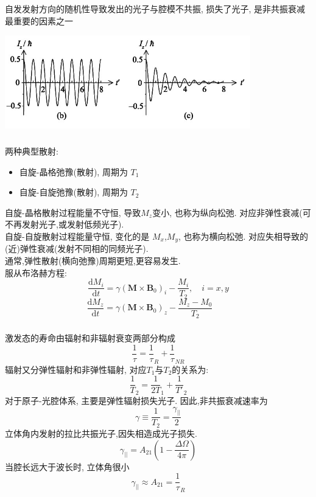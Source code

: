 \begin{frame} 
\frametitle{}
自发发射方向的随机性导致发出的光子与腔模不共振, 损失了光子, 是非共振衰减最重要的因素之一   
  \begin{center}
       \includegraphics[width=0.8\textwidth]{figs/2022-05-25-11-29-29.png}
  \end{center} 
\end{frame}

\begin{frame} 
\frametitle{}
两种典型散射:
\begin{itemize}
    \item 自旋-晶格弛豫(散射), 周期为 $T_1$
    \item 自旋-自旋弛豫(散射), 周期为 $T_2$
\end{itemize}
自旋-晶格散射过程能量不守恒, 导致$M_z$变小, 也称为纵向松弛. 对应非弹性衰减(可不再发射光子,或发射低频光子). \\ 自旋-自旋散射过程能量守恒, 变化的是 $M_x$,$M_y$, 也称为横向松弛. 对应失相导致的(近)弹性衰减(发射不同相的同频光子).  \\ 
通常,弹性散射(横向弛豫)周期更短,更容易发生.\\ {\vspace*{1.3em}} 
服从布洛赫方程: 
\[ \frac{\mathrm{d} M_i}{\mathrm{d}t} = \gamma (\mathbf{M}\times \mathbf{B}_0)_i - \frac{M_i}{T_2}, \quad i=x,y \]
\[ \frac{\mathrm{d} M_z}{\mathrm{d}t} = \gamma (\mathbf{M}\times \mathbf{B}_0)_z - \frac{M_z - M_0}{T_2} \qquad \]
\end{frame}

\begin{frame} 
\frametitle{}
激发态的寿命由辐射和非辐射衰变两部分构成
\[ \frac{1}{\tau} = \frac{1}{\tau}_R +\frac{1}{\tau}_{NR} \] 
辐射又分弹性辐射和非弹性辐射, 对应$T_1$与$T_2$的关系为:
\[ \frac{1}{T}_2 = \frac{1}{2T}_1+ \frac{1}{T'}_2\]
对于原子-光腔体系, 主要是弹性辐射损失光子. 因此,非共振衰减速率为 \[\gamma \equiv \frac{1}{T_2} =  \frac{\gamma_{||}}{2}\]
立体角内发射的拉比共振光子,因失相造成光子损失.
\[ \gamma_{||} = A_{21}(1- \frac{\Delta \Omega}{4\pi })\] 
当腔长远大于波长时, 立体角很小
\[  \gamma_{||} \approx A_{21}= \frac{1}{\tau}_R\] 
\end{frame}


